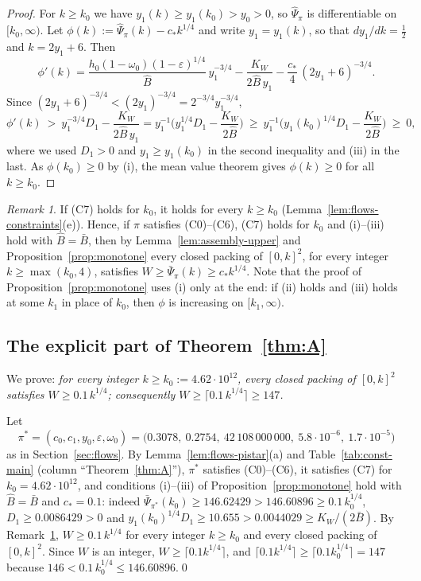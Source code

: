 \documentclass[11pt]{amsart}
\newcommand{\eps}{\varepsilon}
\theoremstyle{definition}
\theoremstyle{remark}
\newtheorem{remark}[theorem]{Remark}
\numberwithin{equation}{section}
\begin{document}
\begin{proof}
For $k\ge k_0$ we have $y_1(k)\ge y_1(k_0)>y_0>0$, so $\hat\Psi_\pi$ is differentiable on $[k_0,\infty)$. Let
$\phi(k):=\hat\Psi_\pi(k)-c_*k^{1/4}$ and write $y_1=y_1(k)$, so that $dy_1/dk=\frac12$ and $k=2y_1+6$. Then
\[
\phi'(k)=\frac{h_0(1-\omega_0)(1-\eps)^{1/4}}{\hat B}\,y_1^{-3/4}-\frac{K_W}{2\hat B\,y_1}-\frac{c_*}{4}\,(2y_1+6)^{-3/4}.
\]
Since $(2y_1+6)^{-3/4}<(2y_1)^{-3/4}=2^{-3/4}y_1^{-3/4}$,
\[
\phi'(k)\ >\ y_1^{-3/4}D_1-\frac{K_W}{2\hat B\,y_1}=y_1^{-1}\Big(y_1^{1/4}D_1-\frac{K_W}{2\hat B}\Big)
\ \ge\ y_1^{-1}\Big(y_1(k_0)^{1/4}D_1-\frac{K_W}{2\hat B}\Big)\ \ge\ 0,
\]
where we used $D_1>0$ and $y_1\ge y_1(k_0)$ in the second inequality and (iii) in the last. As $\phi(k_0)\ge0$ by (i),
the mean value theorem gives $\phi(k)\ge0$ for all $k\ge k_0$.
\end{proof}

\begin{remark}\label{rem:assembly-C7}
If (C7) holds for $k_0$, it holds for every $k\ge k_0$ (Lemma~\ref{lem:flows-constraints}(e)). Hence, if $\pi$
satisfies (C0)--(C6), (C7) holds for $k_0$ and (i)--(iii) hold with $\hat B=\bar B$, then by
Lemma~\ref{lem:assembly-upper} and Proposition~\ref{prop:monotone} every closed packing of $[0,k]^2$, for every integer
$k\ge\max(k_0,4)$, satisfies $W\ge\bar\Psi_\pi(k)\ge c_*k^{1/4}$. Note that the proof of
Proposition~\ref{prop:monotone} uses (i) only at the end: if (ii) holds and (iii) holds at some $k_1$ in place of
$k_0$, then $\phi$ is increasing on $[k_1,\infty)$.
\end{remark}

\subsection{The explicit part of Theorem~\ref{thm:A}}\label{subsec:assembly-explicit}

We prove: \emph{for every integer $k\ge k_0:=4.62\cdot10^{12}$, every closed packing of $[0,k]^2$ satisfies
$W\ge0.1\,k^{1/4}$; consequently $W\ge\lceil0.1\,k^{1/4}\rceil\ge147$.}

Let
\[
\pi^*=(c_0,c_1,y_0,\eps,\omega_0)=\big(0.3078,\ 0.2754,\ 42\,108\,000\,000,\ 5.8\cdot10^{-6},\ 1.7\cdot10^{-5}\big)
\]
as in Section~\ref{sec:flows}. By Lemma~\ref{lem:flows-pistar}(a) and Table~\ref{tab:const-main} (column
``Theorem~\ref{thm:A}''), $\pi^*$ satisfies (C0)--(C6), it satisfies (C7) for $k_0=4.62\cdot10^{12}$, and conditions
(i)--(iii) of Proposition~\ref{prop:monotone} hold with $\hat B=\bar B$ and $c_*=0.1$: indeed
$\bar\Psi_{\pi^*}(k_0)\ge146.62429>146.60896\ge0.1\,k_0^{1/4}$, $D_1\ge0.0086429>0$ and
$y_1(k_0)^{1/4}D_1\ge10.655>0.0044029\ge K_W/(2\bar B)$. By Remark~\ref{rem:assembly-C7}, $W\ge0.1\,k^{1/4}$ for every
integer $k\ge k_0$ and every closed packing of $[0,k]^2$. Since $W$ is an integer, $W\ge\lceil0.1k^{1/4}\rceil$, and
$\lceil0.1k^{1/4}\rceil\ge\lceil0.1k_0^{1/4}\rceil=147$ because $146<0.1\,k_0^{1/4}\le146.60896$.\qed
\end{document}

